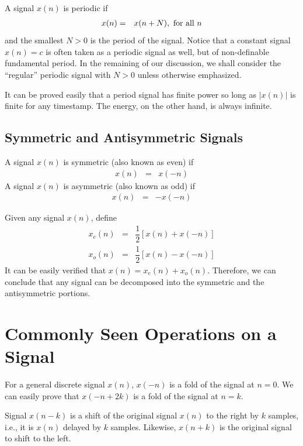 A signal $x(n)$ is periodic if
\begin{eqnarray}
	x(n) &=& x(n + N), \textup{~for all~} n \nonumber
\end{eqnarray}
and the smallest $N>0$ is the period of the signal. Notice that a constant signal $x(n)=c$ is often taken as a periodic signal as well, but of non-definable fundamental period. In the remaining of our discussion, we shall consider the ``regular'' periodic signal with $N>0$ unless otherwise emphasized.

It can be proved easily that a period signal has finite power so long as $|x(n)|$ is finite for any timestamp. The energy, on the other hand, is always infinite.

\subsection{Symmetric and Antisymmetric Signals}

A signal $x(n)$ is symmetric (also known as even) if
\begin{eqnarray}
	x(n) &=& x(-n) \nonumber
\end{eqnarray}
A signal $x(n)$ is asymmetric (also known as odd) if
\begin{eqnarray}
	x(n) &=& -x(-n) \nonumber
\end{eqnarray}

Given any signal $x(n)$, define
\begin{eqnarray}
	x_e(n) &=& \dfrac{1}{2}\left[x(n) + x(-n)\right] \nonumber \\
	x_o(n) &=& \dfrac{1}{2}\left[x(n) - x(-n)\right] \nonumber
\end{eqnarray}
It can be easily verified that $x(n) = x_e(n) + x_o(n)$. Therefore, we can conclude that any signal can be decomposed into the symmetric and the antisymmetric portions.

\section{Commonly Seen Operations on a Signal}

For a general discrete signal $x(n)$, $x(-n)$ is a fold of the signal at $n=0$. We can easily prove that $x(-n+2k)$ is a fold of the signal at $n=k$.

Signal $x(n-k)$ is a shift of the original signal $x(n)$ to the right by $k$ samples, i.e., it is $x(n)$ delayed by $k$ samples. Likewise, $x(n+k)$ is the original signal to shift to the left.

